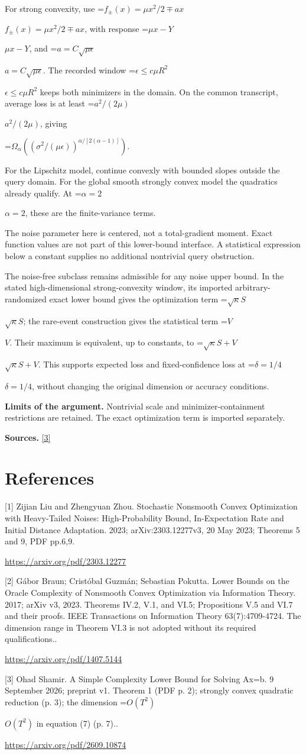 \documentclass[10pt,a4paper]{article}
\newcommand{\AtlasMath}[1]{\par\begingroup\centering\setbox0=\hbox{$\displaystyle #1$}\ifdim\wd0>1.4\linewidth\typeout{ATLAS WIDE FORMULA: \the\wd0}\fi\ifdim\wd0>\linewidth\resizebox{\linewidth}{!}{\box0}\else\box0\fi\par\endgroup}
\newcommand{\AtlasInlineMath}[1]{\begingroup\setbox0=\hbox{$#1$}\ifdim\wd0>.4\linewidth\endgroup\AtlasMath{#1}\else\endgroup$#1$\fi}
\begin{document}
For strong convexity, use \AtlasInlineMath{f_\pm(x)=\mu x^2/2\mp ax}, with response \AtlasInlineMath{\mu x-Y}, and \AtlasInlineMath{a=C\sqrt{\mu\epsilon}}. The recorded window \AtlasInlineMath{\epsilon\le c\mu R^2} keeps both minimizers in the domain. On the common transcript, average loss is at least \AtlasInlineMath{a^2/(2\mu)}, giving

\AtlasMath{\Omega_\alpha((\sigma^2/(\mu\epsilon))^{\alpha/[2(\alpha-1)]}).}

For the Lipschitz model, continue convexly with bounded slopes outside the query domain. For the global smooth strongly convex model the quadratics already qualify. At \AtlasInlineMath{\alpha=2}, these are the finite-variance terms.

The noise parameter here is centered, not a total-gradient moment. Exact function values are not part of this lower-bound interface. A statistical expression below a constant supplies no additional nontrivial query obstruction.

The noise-free subclass remains admissible for any noise upper bound. In the stated high-dimensional strong-convexity window, its imported arbitrary-randomized exact lower bound gives the optimization term \AtlasInlineMath{\sqrt\kappa S}; the rare-event construction gives the statistical term \AtlasInlineMath{V}. Their maximum is equivalent, up to constants, to \AtlasInlineMath{\sqrt\kappa S+V}. This supports expected loss and fixed-confidence loss at \AtlasInlineMath{\delta=1/4}, without changing the original dimension or accuracy conditions.

\textbf{Limits of the argument.} Nontrivial scale and minimizer-containment restrictions are retained. The exact optimization term is imported separately.

\textbf{Sources.} \href{https://arxiv.org/pdf/2609.10874}{[3]}

\section{References}
[1] Zijian Liu and Zhengyuan Zhou. Stochastic Nonsmooth Convex Optimization with Heavy-Tailed Noises: High-Probability Bound, In-Expectation Rate and Initial Distance Adaptation. 2023; arXiv:2303.12277v3, 20 May 2023; Theorems 5 and 9, PDF pp.6,9.

\url{https://arxiv.org/pdf/2303.12277}

[2] Gábor Braun; Cristóbal Guzmán; Sebastian Pokutta. Lower Bounds on the Oracle Complexity of Nonsmooth Convex Optimization via Information Theory. 2017; arXiv v3, 2023. Theorems IV.2, V.1, and VI.5; Propositions V.5 and VI.7 and their proofs. IEEE Transactions on Information Theory 63(7):4709-4724. The dimension range in Theorem VI.3 is not adopted without its required qualifications..

\url{https://arxiv.org/pdf/1407.5144}

[3] Ohad Shamir. A Simple Complexity Lower Bound for Solving Ax=b. 9 September 2026; preprint v1. Theorem 1 (PDF p. 2); strongly convex quadratic reduction (p. 3); the dimension \AtlasInlineMath{O(T^2)} in equation (7) (p. 7)..

\url{https://arxiv.org/pdf/2609.10874}
\end{document}

